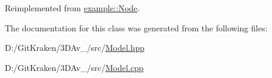 Reimplemented from \mbox{\hyperlink{classexample_1_1_node_a520d3d88a4600b0d9987dbeae10ddede}{example\+::\+Node}}.



The documentation for this class was generated from the following files\+:\begin{DoxyCompactItemize}
\item 
D\+:/\+Git\+Kraken/3\+D\+Av\+\_/src/\mbox{\hyperlink{_model_8hpp}{Model.\+hpp}}\item 
D\+:/\+Git\+Kraken/3\+D\+Av\+\_/src/\mbox{\hyperlink{_model_8cpp}{Model.\+cpp}}\end{DoxyCompactItemize}
